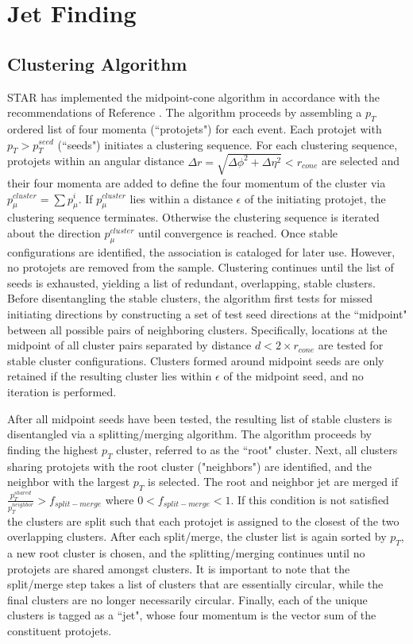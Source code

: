 \section{Jet Finding}

\subsection{Clustering Algorithm}

STAR has implemented the midpoint-cone algorithm in accordance with the
recommendations of Reference \cite{Blazey:2000qt}. The algorithm proceeds by
assembling a $p_{T}$ ordered list of four momenta (``protojets") for each
event. Each protojet with $p_T>p_{T}^{seed}$ (``seeds") initiates a clustering
sequence. For each clustering sequence, protojets within an angular distance
$\Delta r = \sqrt{\Delta\phi^{2} + \Delta\eta ^{2}} < r_{cone}$ are selected
and their four momenta are added to define the four momentum of the cluster
via $p_{\mu}^{cluster} = \sum p_{\mu}^{i}$. If $p_{\mu}^{cluster}$ lies within
a distance $\epsilon$ of the initiating protojet, the clustering sequence
terminates. Otherwise the clustering sequence is iterated about the direction
$p_{\mu}^{cluster}$ until convergence is reached. Once stable configurations
are identified, the association is cataloged for later use. However, no
protojets are removed from the sample. Clustering continues until the list of
seeds is exhausted, yielding a list of redundant, overlapping, stable
clusters. Before disentangling the stable clusters, the algorithm first tests
for missed initiating directions by constructing a set of test seed directions
at the ``midpoint" between all possible pairs of neighboring clusters.
Specifically, locations at the midpoint of all cluster pairs separated by
distance $d < 2 \times r_{cone}$ are tested for stable cluster configurations.
Clusters formed around midpoint seeds are only retained if the resulting
cluster lies within $\epsilon$ of the midpoint seed, and no iteration is
performed.

After all midpoint seeds have been tested, the resulting list of stable
clusters is disentangled via a splitting/merging algorithm. The algorithm
proceeds by finding the highest $p_{T}$ cluster, referred to as the ``root"
cluster. Next, all clusters sharing protojets with the root cluster
("neighbors") are identified, and the neighbor with the largest $p_T$ is
selected. The root and neighbor jet are merged if
$\frac{p_{T}^{shared}}{p_{T}^{neighbor}}>f_{split-merge}$ where $0 <
f_{split-merge} < 1$. If this condition is not satisfied the clusters are
split such that each protojet is assigned to the closest of the two
overlapping clusters. After each split/merge, the cluster list is again sorted
by $p_T$, a new root cluster is chosen, and the splitting/merging continues
until no protojets are shared amongst clusters. It is important to note that
the split/merge step takes a list of clusters that are essentially circular,
while the final clusters are no longer necessarily circular. Finally, each of
the unique clusters is tagged as a ``jet", whose four momentum is the vector
sum of the constituent protojets.

